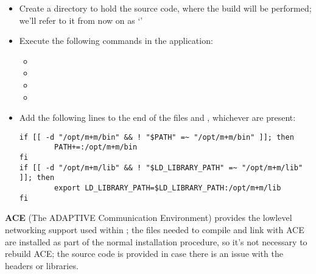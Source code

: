 \secondaryEnd
\tertiaryEnd
{}
\begin{itemize}
\item Create a directory to hold the source code, where the build will be performed; we'll
refer to it from now on as `'
\item\exSp{}Execute the following commands in the  application:
\begin{itemize}
\item {}
\item\exSp{}
\item\exSp{}
\item\exSp{}
\end{itemize}
\item\exSp{}Add the following lines to the end of the files
 and ,
whichever are present:
\begin{verbatim}
if [[ -d "/opt/m+m/bin" && ! "$PATH" =~ "/opt/m+m/bin" ]]; then
        PATH+=:/opt/m+m/bin
fi
if [[ -d "/opt/m+m/lib" && ! "$LD_LIBRARY_PATH" =~ "/opt/m+m/lib" ]]; then
        export LD_LIBRARY_PATH=$LD_LIBRARY_PATH:/opt/m+m/lib
fi
\end{verbatim}
\end{itemize}
\tertiaryEnd
\secondaryEnd
{}
\textbf{ACE} (The ADAPTIVE Communication Environment) provides the low\longDash{}level
networking support used within \mplusm{}; the files needed to compile and link with ACE
are installed as part of the normal \mplusm{} installation procedure, so it's not
necessary to rebuild ACE; the source code is provided in case there is an issue with the
headers or libraries.\\

